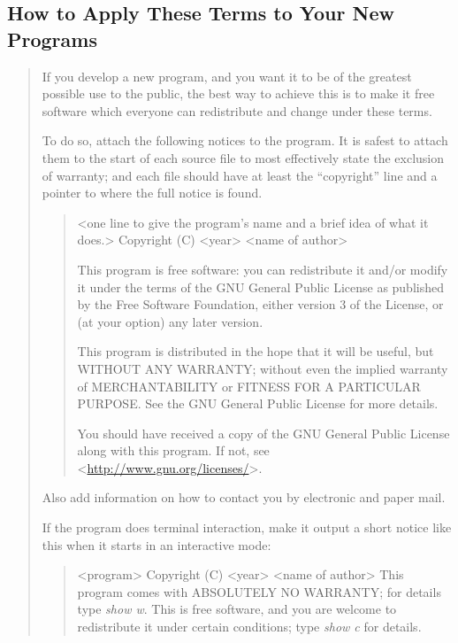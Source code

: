 \documentclass[letterpaper,10pt,english]{sphinxmanual}
\begin{document}
\subsection{How to Apply These Terms to Your New Programs}
\label{docs/license:how-to-apply-these-terms-to-your-new-programs}\begin{quote}

If you develop a new program, and you want it to be of the greatest
possible use to the public, the best way to achieve this is to make it
free software which everyone can redistribute and change under these terms.

To do so, attach the following notices to the program.  It is safest
to attach them to the start of each source file to most effectively
state the exclusion of warranty; and each file should have at least
the ``copyright'' line and a pointer to where the full notice is found.
\begin{quote}

\textless{}one line to give the program's name and a brief idea of what it does.\textgreater{}
Copyright (C) \textless{}year\textgreater{}  \textless{}name of author\textgreater{}

This program is free software: you can redistribute it and/or modify
it under the terms of the GNU General Public License as published by
the Free Software Foundation, either version 3 of the License, or
(at your option) any later version.

This program is distributed in the hope that it will be useful,
but WITHOUT ANY WARRANTY; without even the implied warranty of
MERCHANTABILITY or FITNESS FOR A PARTICULAR PURPOSE.  See the
GNU General Public License for more details.

You should have received a copy of the GNU General Public License
along with this program.  If not, see \textless{}\href{http://www.gnu.org/licenses/}{http://www.gnu.org/licenses/}\textgreater{}.
\end{quote}

Also add information on how to contact you by electronic and paper mail.

If the program does terminal interaction, make it output a short
notice like this when it starts in an interactive mode:
\begin{quote}

\textless{}program\textgreater{}  Copyright (C) \textless{}year\textgreater{}  \textless{}name of author\textgreater{}
This program comes with ABSOLUTELY NO WARRANTY; for details type \emph{show w}.
This is free software, and you are welcome to redistribute it
under certain conditions; type \emph{show c} for details.
\end{quote}


\end{quote}
\end{document}
